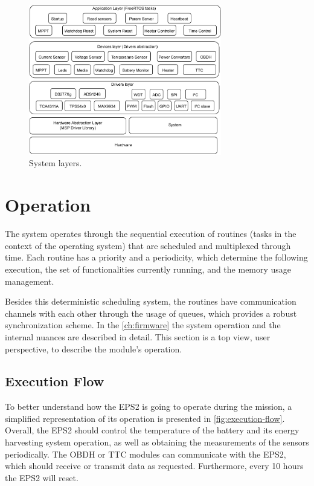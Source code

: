 \begin{figure}[!ht]
    \begin{center}
        \includegraphics[width=0.75\textwidth]{figures/eps-system-layers.pdf}
        \caption{System layers.}
        \label{fig:system-layers}
    \end{center}
\end{figure}

\section{Operation} \label{sec:operation}

The system operates through the sequential execution of routines (tasks in the context of the operating system) that are scheduled and multiplexed through time. Each routine has a priority and a periodicity, which determine the following execution, the set of functionalities currently running, and the memory usage management.

Besides this deterministic scheduling system, the routines have communication channels with each other through the usage of queues, which provides a robust synchronization scheme. In the \autoref{ch:firmware} the system operation and the internal nuances are described in detail. This section is a top view, user perspective, to describe the module's operation.

\subsection{Execution Flow}

To better understand how the EPS2 is going to operate during the mission, a simplified representation of its operation is presented in \autoref{fig:execution-flow}. Overall, the EPS2 should control the temperature of the battery and its energy harvesting system operation, as well as obtaining the measurements of the sensors periodically. The OBDH or TTC modules can communicate with the EPS2, which should receive or transmit data as requested. Furthermore, every 10 hours the EPS2 will reset.

